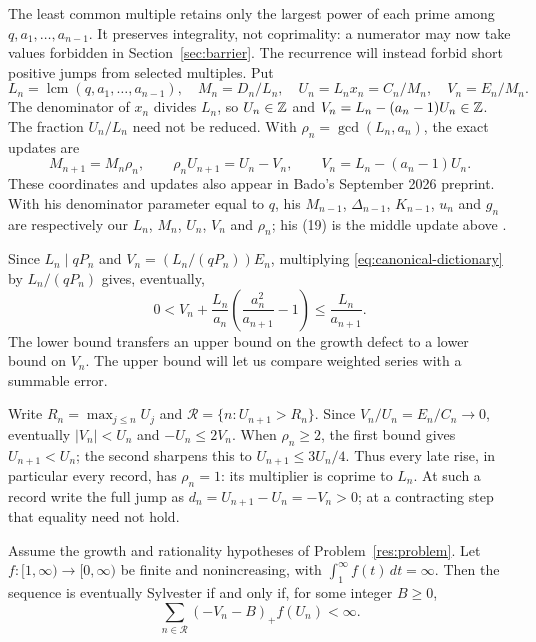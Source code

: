 \documentclass[11pt]{article}
\begin{document}
The least common multiple retains only the largest power of each prime
among $q,a_1,\ldots,a_{n-1}$. It preserves integrality, not coprimality:
a numerator may now take values forbidden in Section~\ref{sec:barrier}.
The recurrence will instead forbid short positive jumps from selected
multiples. Put
\[
 L_n=\operatorname{lcm}(q,a_1,\ldots,a_{n-1}),\quad
 M_n=D_n/L_n,\quad U_n=L_nx_n=C_n/M_n,\quad V_n=E_n/M_n.
\]
The denominator of $x_n$ divides $L_n$, so $U_n\in\mathbb{Z}$ and
$V_n=L_n-(a_n-1)U_n\in\mathbb{Z}$. The fraction $U_n/L_n$ need not be reduced.
With $\rho_n=\gcd(L_n,a_n)$, the exact updates are
\[
 M_{n+1}=M_n\rho_n,\qquad
 \rho_nU_{n+1}=U_n-V_n,\qquad V_n=L_n-(a_n-1)U_n.
\]
These coordinates and updates also appear in Bado's September 2026
preprint. With his denominator parameter equal to $q$, his $M_{n-1}$,
$\Delta_{n-1}$, $K_{n-1}$, $u_n$ and $g_n$ are respectively our $L_n$,
$M_n$, $U_n$, $V_n$ and $\rho_n$; his (19) is the middle update above
\cite[Proposition~7.1 and (16)--(20), pp.~6--7]{bado2026}.

Since $L_n\mid qP_n$ and $V_n=(L_n/(qP_n))E_n$, multiplying
\eqref{eq:canonical-dictionary} by $L_n/(qP_n)$ gives, eventually,
\begin{equation}\label{eq:general-clearance-dictionary}
 0<V_n+\frac{L_n}{a_n}\left(\frac{a_n^2}{a_{n+1}}-1\right)
 \le\frac{L_n}{a_{n+1}}.
\end{equation}
The lower bound transfers an upper bound on the growth defect to a
lower bound on $V_n$. The upper bound will let us compare weighted
series with a summable error.

Write $R_n=\max_{j\le n}U_j$ and
$\mathcal R=\{n:U_{n+1}>R_n\}$. Since $V_n/U_n=E_n/C_n\to0$,
eventually $|V_n|<U_n$ and $-U_n\le2V_n$. When $\rho_n\ge2$, the
first bound gives $U_{n+1}<U_n$; the second sharpens this to
$U_{n+1}\le3U_n/4$. Thus every late rise, in particular every record,
has $\rho_n=1$: its multiplier is coprime to $L_n$. At such a record
write the full jump as $d_n=U_{n+1}-U_n=-V_n>0$; at a contracting
step that equality need not hold.

\begin{theorem}\label{res:weightedrecord}
Assume the growth and rationality hypotheses of Problem~\ref{res:problem}.
Let $f:[1,\infty)\to[0,\infty)$ be finite and nonincreasing, with
$\int_1^\infty f(t)\,dt=\infty$. Then the sequence is eventually Sylvester
if and only if, for some integer $B\ge0$,
\[
 \sum_{n\in\mathcal R}(-V_n-B)_+f(U_n)<\infty.
\]
\end{theorem}
\end{document}
